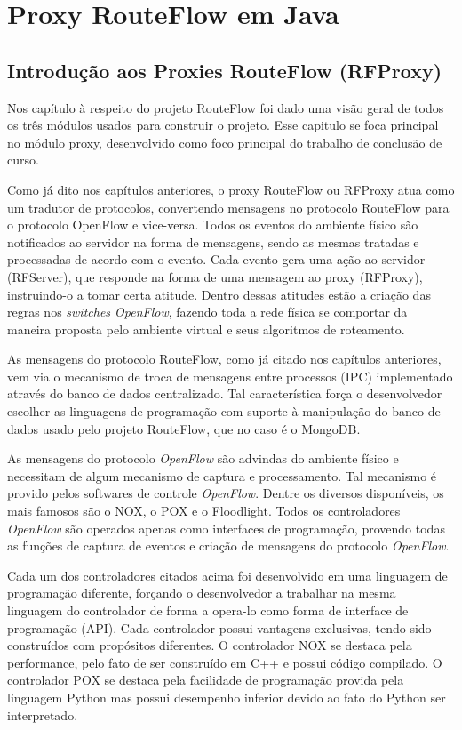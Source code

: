 \chapter{Proxy RouteFlow em Java}

\section{Introdução aos Proxies RouteFlow (RFProxy)}

Nos capítulo à respeito do projeto RouteFlow foi dado
uma visão geral de todos os três módulos usados para
construir o projeto. Esse capitulo se foca principal no 
módulo proxy, desenvolvido como foco principal do trabalho de
conclusão de curso.

Como já dito nos capítulos anteriores, o proxy RouteFlow ou
RFProxy atua como um tradutor de protocolos, convertendo
mensagens no protocolo RouteFlow para o protocolo OpenFlow
e vice-versa. Todos os eventos do ambiente físico são notificados
ao servidor na forma de mensagens, sendo as mesmas tratadas 
e processadas de acordo com o evento. Cada evento gera uma 
ação ao servidor (RFServer), que responde na forma de uma 
mensagem ao proxy (RFProxy), instruindo-o a tomar certa atitude.
Dentro dessas atitudes estão a criação das regras nos \textit{
switches OpenFlow}, fazendo toda a rede física se comportar
da maneira proposta pelo ambiente virtual e seus algoritmos de
roteamento.

As mensagens do protocolo RouteFlow, como já citado nos
capítulos anteriores, vem via o mecanismo de troca de mensagens
entre processos (IPC) implementado através do banco de dados
centralizado. Tal característica força o desenvolvedor escolher
as linguagens de programação com suporte à manipulação do
banco de dados usado pelo projeto RouteFlow, que no caso
é o MongoDB.

As mensagens do protocolo \textit{OpenFlow} são advindas do ambiente
físico e necessitam de algum mecanismo de captura e processamento.
Tal mecanismo é provido pelos softwares de controle \textit{
OpenFlow}. Dentre os diversos disponíveis, os mais famosos
são o NOX, o POX e o Floodlight. Todos os controladores
\textit{OpenFlow} são operados apenas como 
interfaces de programação, provendo todas as funções de captura
de eventos e criação de mensagens do protocolo \textit{OpenFlow}.

Cada um dos controladores citados acima foi desenvolvido em
uma linguagem de programação diferente, forçando o desenvolvedor
a trabalhar na mesma linguagem do controlador de forma a 
opera-lo como forma de interface de programação (API). 
Cada controlador possui vantagens exclusivas, tendo sido construídos
com propósitos diferentes. O controlador NOX se destaca pela
performance, pelo fato de ser construído em C++ e possui
código compilado. O controlador POX se destaca pela
facilidade de programação provida pela linguagem Python mas
possui desempenho inferior devido ao fato do Python ser
interpretado. 

